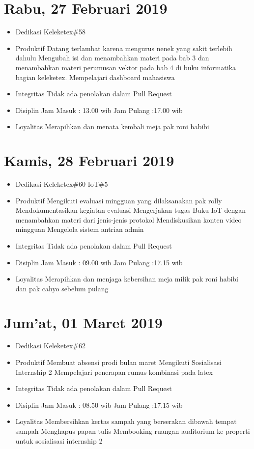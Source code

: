 \section{Rabu, 27 Februari 2019}
\begin{itemize}
\item Dedikasi
  \subitem Keleketex\#58
\item Produktif
  \subitem Datang terlambat karena mengurus nenek yang sakit terlebih dahulu
  \subitem Mengubah isi dan menambahkan materi pada bab 3  dan menambahkan materi perumusan vektor pada bab 4 di buku informatika bagian keleketex.
  \subitem Mempelajari dashboard mahasiswa
\item Integritas
  \subitem Tidak ada penolakan dalam Pull Request
\item Disiplin
  \subitem Jam Masuk : 13.00 wib
  \subitem Jam Pulang :17.00 wib
\item Loyalitas
  \subitem Merapihkan dan menata kembali meja pak roni habibi
\end{itemize}

\section{Kamis, 28 Februari 2019}
\begin{itemize}
\item Dedikasi
  \subitem Keleketex\#60
  \subitem IoT\#5
\item Produktif
  \subitem Mengikuti evaluasi mingguan yang dilaksanakan pak rolly
  \subitem Mendokumentasikan kegiatan evaluasi
  \subitem Mengerjakan tugas Buku IoT dengan menambahkan materi dari jenis-jenis protokol
  \subitem Mendiskusikan konten video mingguan
  \subitem Mengelola sistem antrian admin
\item Integritas
  \subitem Tidak ada penolakan dalam Pull Request
\item Disiplin
  \subitem Jam Masuk : 09.00 wib
  \subitem Jam Pulang :17.15 wib
\item Loyalitas
  \subitem Merapihkan dan menjaga kebersihan meja milik pak roni habibi dan pak cahyo sebelum pulang
\end{itemize}

\section{Jum'at, 01 Maret 2019}
\begin{itemize}
\item Dedikasi
  \subitem Keleketex\#62
\item Produktif
  \subitem Membuat absensi prodi bulan maret
  \subitem Mengikuti Sosialisasi Internship 2
  \subitem Mempelajari penerapan rumus kombinasi pada latex
\item Integritas
  \subitem Tidak ada penolakan dalam Pull Request
\item Disiplin
  \subitem Jam Masuk : 08.50 wib
  \subitem Jam Pulang :17.15 wib
\item Loyalitas
  \subitem Membersihkan kertas sampah yang berserakan dibawah tempat sampah
  \subitem Menghapus papan tulis
  \subitem Membooking ruangan auditorium ke properti untuk sosialisasi internship 2 
\end{itemize}

